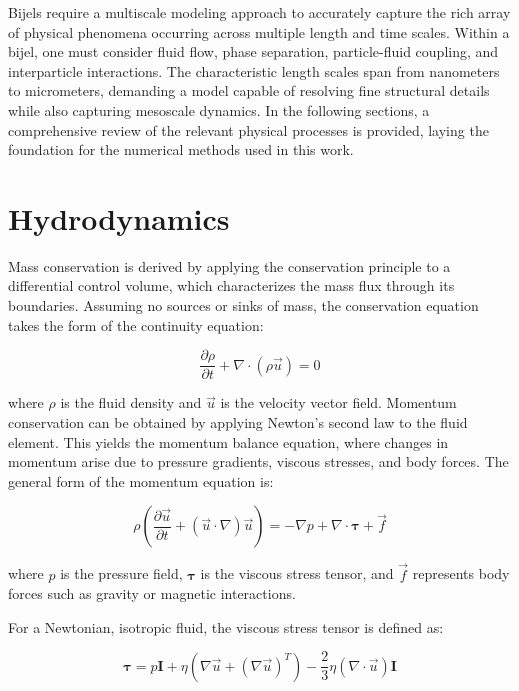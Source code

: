 Bijels require a multiscale modeling approach to accurately capture the rich array of physical phenomena 
occurring across multiple length and time scales. Within a bijel, one must consider fluid flow, phase separation, particle-fluid coupling, and interparticle 
interactions. The characteristic length scales span from nanometers to micrometers, demanding a model capable of resolving fine structural details while also 
capturing mesoscale dynamics. In the following sections, a comprehensive review of the relevant physical processes is provided, laying the foundation for the 
numerical methods used in this work.

\section{Hydrodynamics}

Mass conservation is derived by applying the conservation principle to a differential control volume, which characterizes the mass flux through its boundaries. Assuming no sources or sinks of mass, the conservation equation takes the form of the continuity equation:

\begin{equation}
    \frac{\partial\rho}{\partial t} + \nabla\cdot\left(\rho\vec{u}\right) = 0
\end{equation}

where $\rho$ is the fluid density and $\vec{u}$ is the velocity vector field.
Momentum conservation can be obtained by applying Newton's second law to the fluid element. This yields the momentum balance equation, where changes in momentum arise due to pressure gradients, 
viscous stresses, and body forces. The general form of the momentum equation is:

\begin{equation}
    \rho \left(\frac{\partial\vec{u}}{\partial t} + (\vec{u}\cdot\nabla)\vec{u} \right) = -\nabla p + \nabla \cdot \boldsymbol{\tau} + \vec{f}
\end{equation}

where $p$ is the pressure field, $\boldsymbol{\tau}$ is the viscous stress tensor, and $\vec{f}$ represents body forces such as gravity or magnetic interactions.

For a Newtonian, isotropic fluid, the viscous stress tensor is defined as:

\begin{equation}
    \boldsymbol{\tau} = p\mathbf{I} + \eta\left( \nabla \vec{u} + (\nabla \vec{u})^T \right) - \frac{2}{3}\eta(\nabla \cdot \vec{u})\mathbf{I}
\end{equation}

